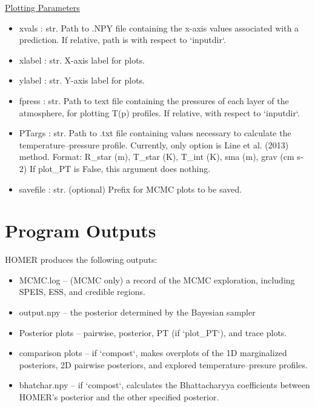 \documentclass[letterpaper, 12pt]{article}
\begin{document}
\noindent \underline{Plotting Parameters}
\begin{itemize}
\item xvals      : str.  Path to .NPY file containing the x-axis values 
                         associated with a prediction.
                         If relative, path is with respect to `inputdir`.
\item xlabel     : str.  X-axis label for plots.
\item ylabel     : str.  Y-axis label for plots.
\item fpress     : str.  Path to text file containing the pressures of each 
                         layer of the atmosphere, for plotting T(p) profiles.
                         If relative, with respect to `inputdir`.
\item PTargs     : str.  Path to .txt file containing values necessary to 
                   calculate the temperature--pressure profile.
                   Currently, only option is Line et al. (2013) method.
                   Format: R\_star (m), T\_star (K), T\_int (K), 
                           sma (m), grav (cm s-2)
                   If plot\_PT is False, this argument does nothing.
\item savefile   : str.  (optional) Prefix for MCMC plots to be saved.
\end{itemize}



\section{Program Outputs}
\label{sec:outputs}

HOMER produces the following outputs:

\begin{itemize}
\item MCMC.log -- (MCMC only) a record of the MCMC exploration, including SPEIS, ESS, and 
                  credible regions.
\item output.npy -- the posterior determined by the Bayesian sampler
\item Posterior plots -- pairwise, posterior, PT (if `plot\_PT`), and trace plots.
\item comparison plots -- if `compost`, makes overplots of the 1D marginalized 
                          posteriors, 2D pairwise posteriors, and explored 
                          temperature--presure profiles.
\item bhatchar.npy -- if `compost`, calculates the Bhattacharyya coefficients 
                      between HOMER's posterior and the other specified 
                      posterior.
\end{itemize}
\end{document}
